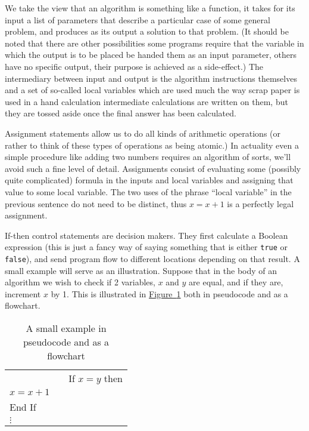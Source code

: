 \documentclass[10pt,]{book}
\theoremstyle{plain}
\theoremstyle{definition}
\theoremstyle{definition}
\numberwithin{equation}{section}
\begin{document}
\par

    We take the view that an algorithm is something like a function, it
    takes for its input a list of parameters that describe a particular
    case of some general problem, and produces as its output a solution to
    that problem. (It should be noted that there are other possibilities \textemdash{} some programs require that the variable in which the output is to
    be placed be handed them as an input parameter, others have no
    specific output, their purpose is achieved as a side-effect.) The
    intermediary between input and output is the algorithm instructions
    themselves and a set of so-called local variables which are used much
    the way scrap paper is used in a hand calculation \textemdash{} intermediate
    calculations are written on them, but they are tossed aside once the
    final answer has been calculated.
\par

    Assignment statements allow us to do all kinds of arithmetic
    operations (or rather to think of these types of operations as being
    atomic.) In actuality even a simple procedure like adding two numbers
    requires an algorithm of sorts, we'll avoid such a fine level of
    detail. Assignments consist of evaluating some (possibly quite
    complicated) formula in the inputs and local variables and assigning
    that value to some local variable. The two uses of the phrase ``local
    variable'' in the previous sentence do not need to be distinct, thus
    \(x = x + 1\) is a perfectly legal assignment.
\par

    If-then control statements are decision makers. They first calculate
    a Boolean expression (this is just a fancy way of saying something
    that is either \lstinline?true? or \lstinline?false?), and send program flow to
    different locations depending on that result. A small example will
    serve as an illustration. Suppose that in the body of an algorithm we
    wish to check if 2 variables, \(x\) and \(y\) are equal, and if they are,
    increment \(x\) by 1. This is illustrated in \hyperref[fig_if-then]{Figure~\ref{fig_if-then}}
    both in pseudocode and as a flowchart.
\leavevmode%
\begin{table}
\centering
\begin{tabular}{lll}

          {

}

        &&
         If \(x=y\) then\tabularnewline[0pt]
\(x=x+1\)\tabularnewline[0pt]
End If\tabularnewline[0pt]
\(\vdots\)\tabularnewline[0pt]

\end{tabular}
\caption{A small example in pseudocode and as a flowchart\label{fig_if-then}}
\end{table}
\par
\end{document}

